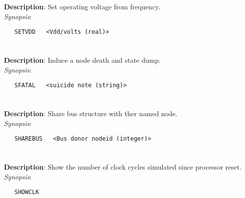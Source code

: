 \section{\quad{}}
\label{manpages:SETVDD}
\label{manpages:setvdd}
\vspace{-0.1in}
{\bf Description}: 	Set operating voltage from frequency.\\[1.5ex]
{\em Synopsis}:
\vspace{-0.05in}
\scriptsize
\begin{lstlisting}
   SETVDD   <Vdd/volts (real)>							
\end{lstlisting}
\normalsize
\vspace{-0.05in}


\section{\quad{}}
\label{manpages:SFATAL}
\label{manpages:sfatal}
\vspace{-0.1in}
{\bf Description}: 	Induce a node death and state dump.\\[1.5ex]
{\em Synopsis}:
\vspace{-0.05in}
\scriptsize
\begin{lstlisting}
   SFATAL   <suicide note (string)>																		
\end{lstlisting}
\normalsize
\vspace{-0.05in}


\section{\quad{}}
\label{manpages:SHAREBUS}
\label{manpages:sharebus}
\vspace{-0.1in}
{\bf Description}: 	Share bus structure with ther named node.\\[1.5ex]
{\em Synopsis}:
\vspace{-0.05in}
\scriptsize
\begin{lstlisting}
   SHAREBUS   <Bus donor nodeid (integer)>																	
\end{lstlisting}
\normalsize
\vspace{-0.05in}


\section{\quad{}}
\label{manpages:SHOWCLK}
\label{manpages:showclk}
\vspace{-0.1in}
{\bf Description}: 	Show the number of clock cycles simulated since processor reset.\\[1.5ex]
{\em Synopsis}:
\vspace{-0.05in}
\scriptsize
\begin{lstlisting}
   SHOWCLK   						
\end{lstlisting}
\normalsize
\vspace{-0.05in}


